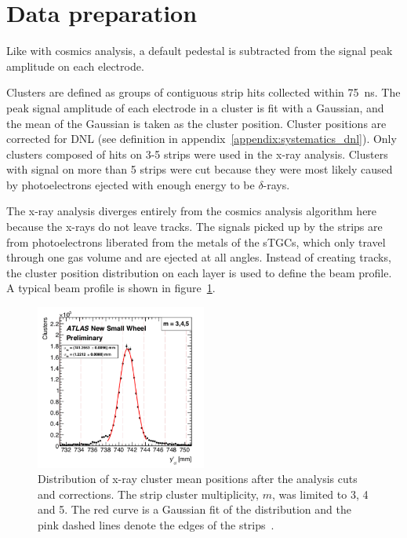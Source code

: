 \section{Data preparation}

Like with cosmics analysis, a default pedestal is subtracted from the signal peak amplitude on each electrode.

Clusters are defined as groups of contiguous strip hits collected within \SI{75}{ns}. The peak signal amplitude of each electrode in a cluster is fit with a Gaussian, and the mean of the Gaussian is taken as the cluster position. Cluster positions are corrected for DNL (see definition in appendix~\ref{appendix:systematics_dnl}). Only clusters composed of hits on 3-5 strips were used in the x-ray analysis. Clusters with signal on more than 5 strips were cut because they were most likely caused by photoelectrons ejected with enough energy to  be $\delta$-rays.

The x-ray analysis diverges entirely from the cosmics analysis algorithm here because the x-rays do not leave tracks. The signals picked up by the strips are from photoelectrons liberated from the metals of the sTGCs, which only travel through one gas volume and are ejected at all angles. Instead of creating tracks, the cluster position distribution on each layer is used to define the beam profile. A typical beam profile is shown in figure~\ref{fig:xray_beam_profile}.

\begin{figure}
    \centering
    \includegraphics[width = 0.5\textwidth]{figures/figure_xray_beam_profile.pdf}
    \caption{Distribution of x-ray cluster mean positions after the analysis cuts and corrections. The strip cluster multiplicity, $m$, was limited to 3, 4 and 5. The red curve is a Gaussian fit of the distribution and the pink dashed lines denote the edges of the strips~\cite{lefebvre_precision_2020}.}
    \label{fig:xray_beam_profile}
\end{figure}

